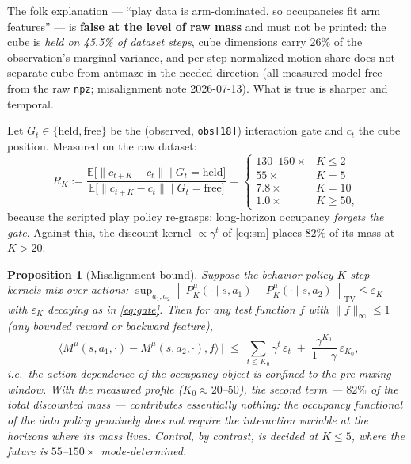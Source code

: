 \documentclass[11pt]{article}
\newcommand{\E}{\mathbb{E}}
\newcommand{\TV}[1]{\left\lVert #1\right\rVert_{\mathrm{TV}}}
\newtheorem{proposition}{Proposition}
\theoremstyle{definition}
\theoremstyle{remark}
\begin{document}
The folk explanation --- ``play data is arm-dominated, so occupancies fit arm features'' ---
is \textbf{false at the level of raw mass} and must not be printed: the cube is \emph{held on
45.5\% of dataset steps}, cube dimensions carry 26\% of the observation's marginal variance,
and per-step normalized motion share does not separate cube from antmaze in the needed
direction (all measured model-free from the raw \texttt{npz}; misalignment note 2026-07-13).
What is true is sharper and temporal.

Let $G_t\in\{\text{held},\text{free}\}$ be the (observed, \texttt{obs[18]}) interaction gate
and $c_t$ the cube position. Measured on the raw dataset:
\begin{equation}
R_K:=\frac{\E\big[\|c_{t+K}-c_t\|\;\big|\;G_t=\text{held}\big]}
{\E\big[\|c_{t+K}-c_t\|\;\big|\;G_t=\text{free}\big]}
=\begin{cases}
130\text{--}150\times & K\le 2\\
55\times & K=5\\
7.8\times & K=10\\
1.0\times & K\ge 50,
\end{cases}
\label{eq:gate}
\end{equation}
because the scripted play policy re-grasps: long-horizon occupancy \emph{forgets the gate}.
Against this, the discount kernel $\propto\gamma^t$ of \eqref{eq:sm} places $82\%$ of its
mass at $K>20$.

\begin{proposition}[Misalignment bound]\label{prop:misalignment}
Suppose the behavior-policy $K$-step kernels mix over actions:
$\sup_{a_1,a_2}\TV{P^\mu_K(\cdot\mid s,a_1)-P^\mu_K(\cdot\mid s,a_2)}\le\varepsilon_K$ with
$\varepsilon_K$ decaying as in \eqref{eq:gate}. Then for any test function $f$ with
$\|f\|_\infty\le 1$ (any bounded reward or backward feature),
\begin{equation}
\big|\,\langle M^{\mu}(s,a_1,\cdot)-M^{\mu}(s,a_2,\cdot),f\rangle\,\big|
\;\le\;\sum_{t\le K_0}\gamma^{t}\,\varepsilon_t\;+\;\frac{\gamma^{K_0}}{1-\gamma}\,
\varepsilon_{K_0},
\label{eq:bound}
\end{equation}
i.e.\ the action-dependence of the occupancy object is confined to the pre-mixing window.
With the measured profile ($K_0\approx 20$--$50$), the second term --- $82\%$ of the total
discounted mass --- contributes essentially nothing: \emph{the occupancy functional of the
data policy genuinely does not require the interaction variable at the horizons where its
mass lives}. Control, by contrast, is decided at $K\le 5$, where the future is
$55$--$150\times$ mode-determined.
\end{proposition}
\end{document}
